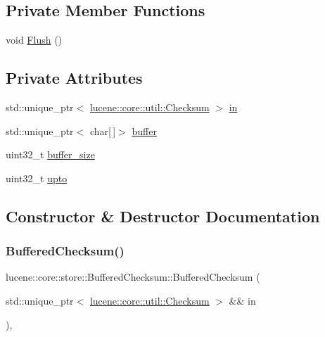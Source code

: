 \subsection*{Private Member Functions}
\begin{DoxyCompactItemize}
\item 
void \mbox{\hyperlink{classlucene_1_1core_1_1store_1_1BufferedChecksum_ad275562da513ebba930d630a7afe2aeb}{Flush}} ()
\end{DoxyCompactItemize}
\subsection*{Private Attributes}
\begin{DoxyCompactItemize}
\item 
std\+::unique\+\_\+ptr$<$ \mbox{\hyperlink{classlucene_1_1core_1_1util_1_1Checksum}{lucene\+::core\+::util\+::\+Checksum}} $>$ \mbox{\hyperlink{classlucene_1_1core_1_1store_1_1BufferedChecksum_a5c92d0cdf327fef20d149b87770f8b3b}{in}}
\item 
std\+::unique\+\_\+ptr$<$ char\mbox{[}$\,$\mbox{]}$>$ \mbox{\hyperlink{classlucene_1_1core_1_1store_1_1BufferedChecksum_ab7f993f0ba0fe96f4d2354734089625f}{buffer}}
\item 
uint32\+\_\+t \mbox{\hyperlink{classlucene_1_1core_1_1store_1_1BufferedChecksum_ad285bdb06c709d498833d692794e36e0}{buffer\+\_\+size}}
\item 
uint32\+\_\+t \mbox{\hyperlink{classlucene_1_1core_1_1store_1_1BufferedChecksum_abe5f8d87f42a6987ea28d175aa653e74}{upto}}
\end{DoxyCompactItemize}


\subsection{Constructor \& Destructor Documentation}
\mbox{\label{classlucene_1_1core_1_1store_1_1BufferedChecksum_aa8f189858ddd57d76d2c6da52131d7e4}} 
\subsubsection{\texorpdfstring{Buffered\+Checksum()}{BufferedChecksum()}\hspace{0.1cm}{\footnotesize\ttfamily [1/2]}}
{\footnotesize\ttfamily lucene\+::core\+::store\+::\+Buffered\+Checksum\+::\+Buffered\+Checksum (\begin{DoxyParamCaption}\item[{std\+::unique\+\_\+ptr$<$ \mbox{\hyperlink{classlucene_1_1core_1_1util_1_1Checksum}{lucene\+::core\+::util\+::\+Checksum}} $>$ \&\&}]{in }\end{DoxyParamCaption})\hspace{0.3cm}{\ttfamily [inline]}, {\ttfamily [explicit]}}

